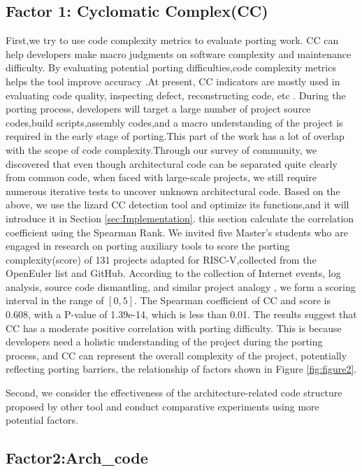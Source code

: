 \documentclass[sigconf,screen,review,anonymous]{acmart}
\begin{document}
\subsection{Factor 1: Cyclomatic Complex(CC)}
\label{sec:factor-1}
First,we try to use code complexity metrics to evaluate porting work.
CC can help developers make macro judgments on software complexity and maintenance difficulty. By evaluating potential porting difficulties,code complexity metrics helps the tool improve accuracy \cite{2005Exploring}.At present, CC indicators are mostly used in evaluating code quality, inspecting defect, reconstructing code, etc \cite{1991Cyclomatic}.
During the porting process, developers will target a large number of project source codes,build scripts,assembly codes,and a macro understanding of the project is required in the early stage of porting.This part of the work has a lot of overlap with the scope of code complexity.Through our survey of community, we discovered that even though architectural code can be separated quite clearly from common code, when faced with large-scale projects, we still require numerous iterative tests to uncover unknown architectural code.
Based on the above, we use the lizard CC detection tool and optimize its functions,and it will introduce it in Section \ref{sec:Implementation}.
this section calculate the correlation coefficient using the Spearman Rank.
We invited five Master's students who are engaged in research on porting auxiliary tools to score the porting complexity(score) of 131 projects adapted for RISC-V,collected from the OpenEuler list\citep{stage2023} and GitHub.
According to the collection of Internet events, log analysis, source code dismantling, and similar project analogy \cite{liangguanyu2020}, we form a scoring interval in the range of $[0,5]$.
The Spearman coefficient of CC and score is 0.608, with a P-value of 1.39e-14, which is less than 0.01.
The results suggest that CC has a moderate positive correlation with porting difficulty.
This is because developers need a holistic understanding of the project during the porting process, and CC can represent the overall complexity of the project, potentially reflecting porting barriers, the relationship of factors shown in Figure \ref{fig:figure2}.




Second, we consider the effectiveness of the architecture-related code structure proposed by other tool and conduct comparative experiments using more potential factors.
\subsection{Factor2:Arch\_code}
\end{document}
